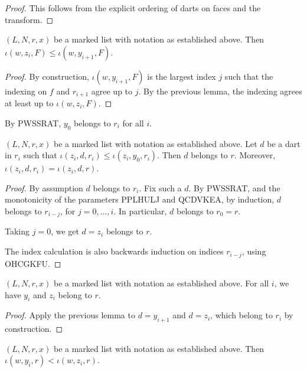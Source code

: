\begin{proof} This follows from the explicit ordering of darts on faces and the transform.
\end{proof}

\begin{lemma}
$(L,N,r,x)$ be a marked list with notation as established above.
Then $\iota(w,z_i,F) \le \iota(w,y_{i+1},F)$.
\end{lemma}

\begin{proof} By construction,  $\iota(w,y_{i+1},F)$ is the 
largest index $j$ such that the indexing on $f$ and $r_{i+1}$ agree up to $j$.
By the previous lemma, the indexing agrees at least up to $\iota(w,z_i,F)$.
\end{proof}

By PWSSRAT, $y_0$ belongs to $r_i$ for all $i$.

\begin{lemma}
$(L,N,r,x)$ be a marked list with notation as established above.
Let $d$ be a dart in $r_i$ such that
$\iota(z_i,d,r_i) \le \iota(z_i,y_0,r_i)$. Then $d$ belongs to $r$.
Moreover, $\iota(z_i,d,r_i) = \iota(z_i,d,r)$.
\end{lemma}

\begin{proof}
By assumption $d$ belongs to $r_i$.
Fix such a $d$.  By PWSSRAT, and the monotonicity of the parameters PPLHULJ and QCDVKEA,
by induction, $d$ belongs to $r_{i-j}$, for $j=0,\ldots,i$.  In particular, $d$ belongs to $r_0 = r$.

Taking $j=0$, we get $d=z_i$ belongs to $r$.

The index calculation is also backwards induction on indices $r_{i-j}$, using 
OHCGKFU.
\end{proof}

\begin{lemma}
$(L,N,r,x)$ be a marked list with notation as established above.
For all $i$, we have $y_i$ and $z_i$ belong to $r$.
\end{lemma}

\begin{proof}
Apply the previous lemma to $d = y_{i+1}$ and $d=z_i$, which belong to $r_i$ by construction.
\end{proof}

\begin{lemma}
$(L,N,r,x)$ be a marked list with notation as established above.
Then $\iota(w,y_i,r) < \iota(w,z_i,r)$.
\end{lemma}

